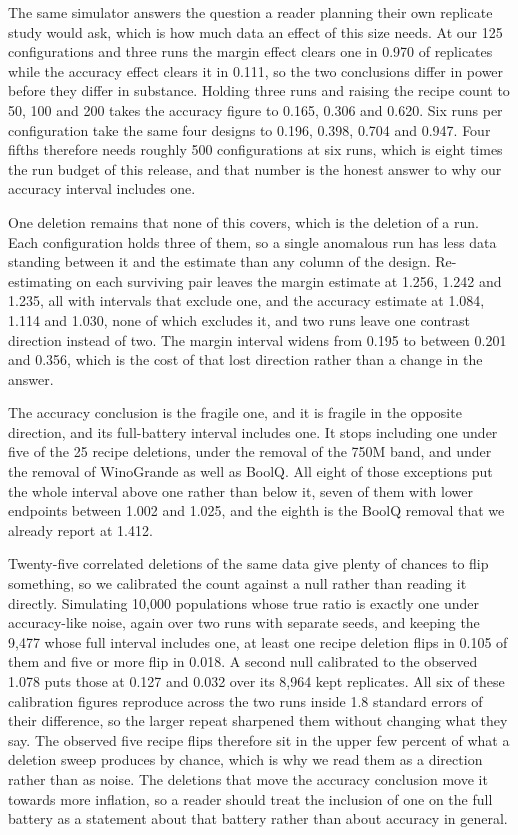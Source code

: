 The same simulator answers the question a reader planning their own replicate study would ask, which is how much data an effect of this size needs. At our 125 configurations and three runs the margin effect clears one in 0.970 of replicates while the accuracy effect clears it in 0.111, so the two conclusions differ in power before they differ in substance. Holding three runs and raising the recipe count to 50, 100 and 200 takes the accuracy figure to 0.165, 0.306 and 0.620. Six runs per configuration take the same four designs to 0.196, 0.398, 0.704 and 0.947. Four fifths therefore needs roughly 500 configurations at six runs, which is eight times the run budget of this release, and that number is the honest answer to why our accuracy interval includes one.

One deletion remains that none of this covers, which is the deletion of a run. Each configuration holds three of them, so a single anomalous run has less data standing between it and the estimate than any column of the design. Re-estimating on each surviving pair leaves the margin estimate at 1.256, 1.242 and 1.235, all with intervals that exclude one, and the accuracy estimate at 1.084, 1.114 and 1.030, none of which excludes it, and two runs leave one contrast direction instead of two. The margin interval widens from 0.195 to between 0.201 and 0.356, which is the cost of that lost direction rather than a change in the answer.

The accuracy conclusion is the fragile one, and it is fragile in the opposite direction, and its full-battery interval includes one. It stops including one under five of the 25 recipe deletions, under the removal of the 750M band, and under the removal of WinoGrande as well as BoolQ. All eight of those exceptions put the whole interval above one rather than below it, seven of them with lower endpoints between 1.002 and 1.025, and the eighth is the BoolQ removal that we already report at 1.412.

Twenty-five correlated deletions of the same data give plenty of chances to flip something, so we calibrated the count against a null rather than reading it directly. Simulating 10,000 populations whose true ratio is exactly one under accuracy-like noise, again over two runs with separate seeds, and keeping the 9,477 whose full interval includes one, at least one recipe deletion flips in 0.105 of them and five or more flip in 0.018. A second null calibrated to the observed 1.078 puts those at 0.127 and 0.032 over its 8,964 kept replicates. All six of these calibration figures reproduce across the two runs inside 1.8 standard errors of their difference, so the larger repeat sharpened them without changing what they say. The observed five recipe flips therefore sit in the upper few percent of what a deletion sweep produces by chance, which is why we read them as a direction rather than as noise. The deletions that move the accuracy conclusion move it towards more inflation, so a reader should treat the inclusion of one on the full battery as a statement about that battery rather than about accuracy in general.

